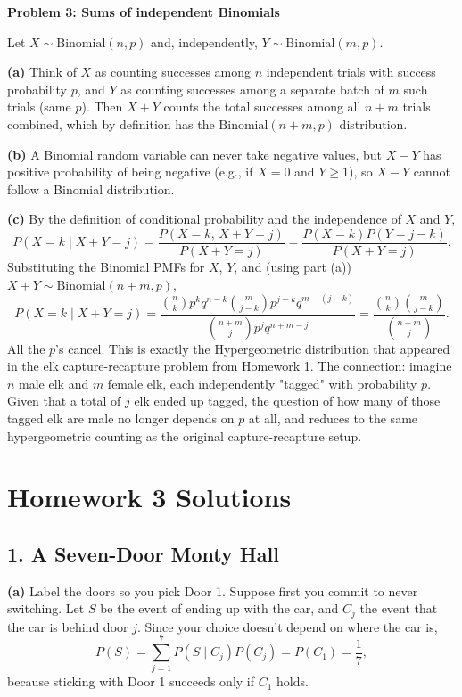 \documentclass{article}
\begin{document}
\bigskip
\textbf{Problem 3: Sums of independent Binomials}

Let $X\sim\text{Binomial}(n,p)$ and, independently, $Y\sim\text{Binomial}(m,p)$.

\medskip
\textbf{(a)} Think of $X$ as counting successes among $n$ independent trials with success probability $p$, and $Y$ as counting successes among a separate batch of $m$ such trials (same $p$). Then $X+Y$ counts the total successes among all $n+m$ trials combined, which by definition has the $\text{Binomial}(n+m,p)$ distribution.

\medskip
\textbf{(b)} A Binomial random variable can never take negative values, but $X-Y$ has positive probability of being negative (e.g., if $X=0$ and $Y\ge1$), so $X-Y$ cannot follow a Binomial distribution.

\medskip
\textbf{(c)} By the definition of conditional probability and the independence of $X$ and $Y$,
$$
P(X=k\mid X+Y=j) = \frac{P(X=k,\,X+Y=j)}{P(X+Y=j)} = \frac{P(X=k)P(Y=j-k)}{P(X+Y=j)}.
$$
Substituting the Binomial PMFs for $X$, $Y$, and (using part (a)) $X+Y\sim\text{Binomial}(n+m,p)$,
$$
P(X=k\mid X+Y=j) = \frac{\binom{n}{k}p^k q^{n-k}\binom{m}{j-k}p^{j-k}q^{m-(j-k)}}{\binom{n+m}{j}p^jq^{n+m-j}} = \frac{\binom{n}{k}\binom{m}{j-k}}{\binom{n+m}{j}}.
$$
All the $p$'s cancel. This is exactly the Hypergeometric distribution that appeared in the elk capture-recapture problem from Homework 1. The connection: imagine $n$ male elk and $m$ female elk, each independently "tagged" with probability $p$. Given that a total of $j$ elk ended up tagged, the question of how many of those tagged elk are male no longer depends on $p$ at all, and reduces to the same hypergeometric counting as the original capture-recapture setup.

\bigskip
\section*{Homework 3 Solutions}

\subsection*{1. A Seven-Door Monty Hall}

\textbf{(a)} Label the doors so you pick Door 1. Suppose first you commit to never switching. Let $S$ be the event of ending up with the car, and $C_j$ the event that the car is behind door $j$. Since your choice doesn't depend on where the car is,
$$
P(S) = \sum_{j=1}^{7}P(S\mid C_j)P(C_j) = P(C_1) = \frac{1}{7},
$$
because sticking with Door 1 succeeds only if $C_1$ holds.
\end{document}
